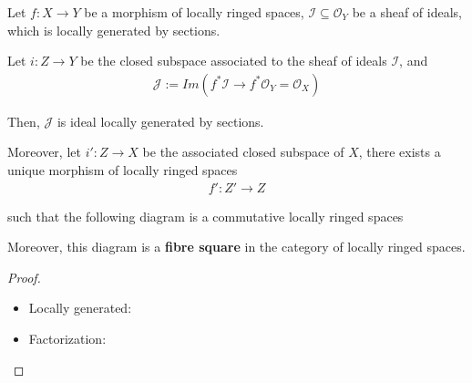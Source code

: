 \documentclass[Total.tex]{subfiles}
\begin{document}
				
				\begin{proposition}
					Let $f:X\rightarrow Y$ be a morphism of locally ringed spaces, $\mathcal{I}\subseteq \mathcal{O}_Y$ be a sheaf of ideals, which is locally generated by sections.
					
					Let $i:Z\rightarrow Y$ be the closed subspace associated to the sheaf of ideals $\mathcal{I}$, and
					\begin{gather*}
						\mathcal{J}:=Im(f^*\mathcal{I}\rightarrow f^*\mathcal{O}_Y=\mathcal{O}_X)
					\end{gather*}
					
					Then, $\mathcal{J}$ is ideal locally generated by sections.
					
					Moreover, let $i':Z\rightarrow X$ be the associated closed subspace of $X$, there exists a unique morphism of locally ringed spaces
					\begin{gather*}
						f':Z'\rightarrow Z
					\end{gather*}
					
					such that the following diagram is a commutative locally ringed spaces
					\begin{center}
					\end{center}
					
					Moreover, this diagram is a \textbf{fibre square} in the category of locally ringed spaces.
				\end{proposition}
				\begin{proof}
					\begin{itemize}
						\item Locally generated:
						\item Factorization:
					\end{itemize}
				\end{proof}
				
\end{document}
